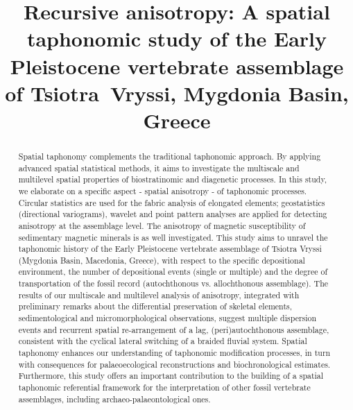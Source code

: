 \documentclass[review,times,authoryear]{elsarticle} %
\begin{document}
\begin{frontmatter}
  
  \title{Recursive anisotropy: A spatial taphonomic study of the Early Pleistocene vertebrate assemblage of Tsiotra~Vryssi, Mygdonia Basin, Greece}
  
  
  

  \begin{abstract}
    Spatial taphonomy complements the traditional taphonomic approach. By applying advanced spatial statistical methods, it aims to investigate the multiscale and multilevel spatial properties of biostratinomic and diagenetic processes. In this study, we elaborate on a specific aspect - spatial anisotropy - of taphonomic processes. Circular statistics are used for the fabric analysis of elongated elements; geostatistics (directional variograms), wavelet and point pattern analyses are applied for detecting anisotropy at the assemblage level. The anisotropy of magnetic susceptibility of sedimentary magnetic minerals is as well investigated. This study aims to unravel the taphonomic history of the Early Pleistocene vertebrate assemblage of Tsiotra Vryssi (Mygdonia Basin, Macedonia, Greece), with respect to the specific depositional environment, the number of depositional events (single or multiple) and the degree of transportation of the fossil record (autochthonous vs. allochthonous assemblage). The results of our multiscale and multilevel analysis of anisotropy, integrated with preliminary remarks about the differential preservation of skeletal elements, sedimentological and micromorphological observations, suggest multiple dispersion events and recurrent spatial re-arrangement of a lag, (peri)autochthonous assemblage, consistent with the cyclical lateral switching of a braided fluvial system. Spatial taphonomy enhances our understanding of taphonomic modification processes, in turn with consequences for palaeoecological reconstructions and biochronological estimates. Furthermore, this study offers an important contribution to the building of a spatial taphonomic referential framework for the interpretation of other fossil vertebrate assemblages, including archaeo-palaeontological ones.
  \end{abstract}
  

\end{frontmatter}
\end{document}
